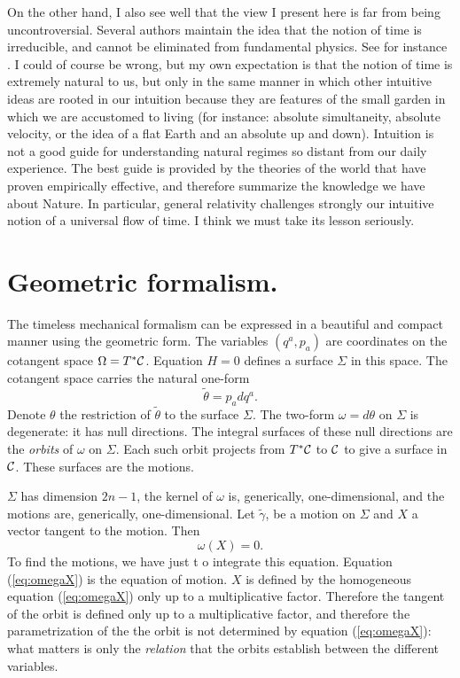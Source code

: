 \documentclass[10pt,nofootinbib]{revtex4}
\begin{document}
On the other hand, I also see well that the view I present here is far from being uncontroversial.
Several authors maintain the idea that the notion of time is irreducible, and cannot be eliminated from fundamental physics. See for instance \cite{Smolin:2000vs}. I could of course be wrong, but my own expectation is that the notion of time is extremely natural to us, but only in the same manner in which other intuitive ideas are rooted in our intuition because they are features of the small garden in which we are accustomed to living (for instance: absolute simultaneity, absolute velocity, or the idea of a flat Earth and an absolute up and down).  Intuition is not a good guide for understanding natural regimes so distant from our daily experience. The best guide is provided by the theories of the world that have proven empirically effective, and therefore summarize the knowledge we have about Nature.  In particular, general relativity challenges strongly our intuitive notion of a universal flow of time. I think we must take its lesson seriously. 


\appendix

\section{Geometric formalism.}\label{presymplectic}

The timeless mechanical formalism can be expressed in a beautiful and compact manner
using the geometric form.  The variables $(q^a, p_{a})$ are
coordinates on the cotangent space $\Omega=T^*{\cal C}$. Equation $H=0$ 
defines a surface $\Sigma$ in this space. The cotangent space
carries the natural one-form
\begin{equation}
\tilde\theta=p_{a}dq^a.
\end{equation}
Denote $\theta$ the restriction of $\tilde\theta$ to the surface $\Sigma$.  The
two-form $\omega=d\theta$ on $\Sigma$ is degenerate: it has null directions. 
The integral surfaces of these null directions are the \emph{orbits} of $\omega$
on $\Sigma$.  Each such orbit projects from $T^*{\cal C}$ to $\cal C$ to give a
surface in $\cal C$.  These surfaces are the motions.

$\Sigma$ has dimension $2n-1$, the kernel of $\omega$ is, generically, one-dimensional, and the motions are, generically, one-dimensional.  Let $\tilde\gamma$, be a motion on $\Sigma$
and $X$ a vector tangent to the motion.  Then
\begin{equation}
	   \omega(X)=0.
    \label{eq:omegaX}
\end{equation}
To find the motions, we have just t
 o integrate this equation.  Equation
(\ref{eq:omegaX}) is the equation of motion.  $X$ is defined by the homogeneous
equation (\ref{eq:omegaX}) only up to a multiplicative factor.  Therefore the
tangent of the orbit is defined only up to a multiplicative factor, and
therefore the parametrization of the the orbit is not determined by equation
(\ref{eq:omegaX}): what matters is only the \emph{relation} that the orbits establish
between the different variables.
\end{document}

